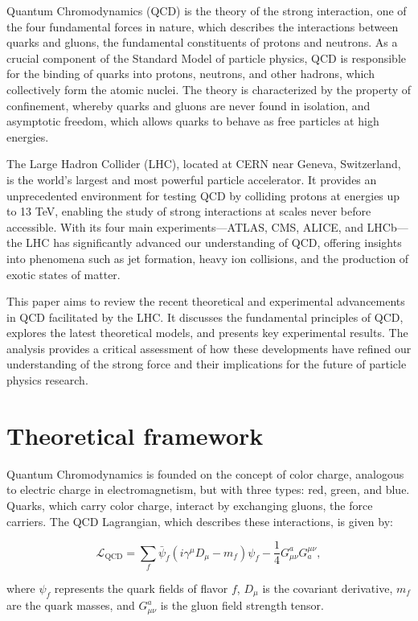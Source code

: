 \documentclass{article}
\begin{document}
Quantum Chromodynamics (QCD) is the theory of the strong interaction, one of the four fundamental forces in nature, which describes the interactions between quarks and gluons, the fundamental constituents of protons and neutrons. As a crucial component of the Standard Model of particle physics, QCD is responsible for the binding of quarks into protons, neutrons, and other hadrons, which collectively form the atomic nuclei. The theory is characterized by the property of confinement, whereby quarks and gluons are never found in isolation, and asymptotic freedom, which allows quarks to behave as free particles at high energies.

The Large Hadron Collider (LHC), located at CERN near Geneva, Switzerland, is the world's largest and most powerful particle accelerator. It provides an unprecedented environment for testing QCD by colliding protons at energies up to 13 TeV, enabling the study of strong interactions at scales never before accessible. With its four main experiments—ATLAS, CMS, ALICE, and LHCb—the LHC has significantly advanced our understanding of QCD, offering insights into phenomena such as jet formation, heavy ion collisions, and the production of exotic states of matter.

This paper aims to review the recent theoretical and experimental advancements in QCD facilitated by the LHC. It discusses the fundamental principles of QCD, explores the latest theoretical models, and presents key experimental results. The analysis provides a critical assessment of how these developments have refined our understanding of the strong force and their implications for the future of particle physics research.

\section{Theoretical framework}

Quantum Chromodynamics is founded on the concept of color charge, analogous to electric charge in electromagnetism, but with three types: red, green, and blue. Quarks, which carry color charge, interact by exchanging gluons, the force carriers. The QCD Lagrangian, which describes these interactions, is given by:

$$
\mathcal{L}_{\text{QCD}} = \sum_{f}\bar{\psi}_f(i\gamma^{\mu}D_{\mu} - m_f)\psi_f - \frac{1}{4}G^{a}_{\mu\nu}G^{\mu\nu}_a,
$$

where $\psi_f$ represents the quark fields of flavor $f$, $D_{\mu}$ is the covariant derivative, $m_f$ are the quark masses, and $G^{a}_{\mu\nu}$ is the gluon field strength tensor.
\end{document}
